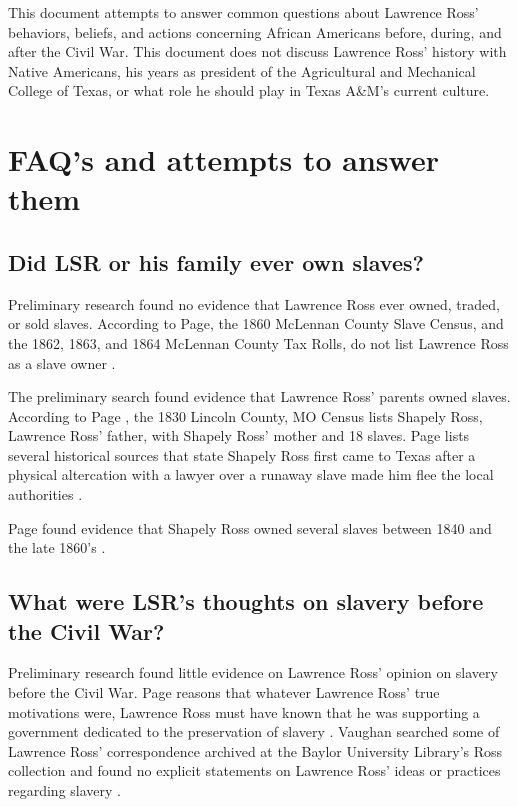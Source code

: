 \documentclass[12pt]{article}
\begin{document}
This document attempts to answer common questions about Lawrence Ross' behaviors, beliefs, and actions concerning African Americans before, during, and after the Civil War. This document does not discuss Lawrence Ross' history with Native Americans, his years as president of the Agricultural and Mechanical College of Texas, or what role he should play in Texas A\&M's current culture. 

\newpage
\section{FAQ's and attempts to answer them}

\subsection{Did LSR or his family ever own slaves? }
Preliminary research found no evidence that Lawrence Ross ever owned, traded, or sold slaves. According to Page, the 1860 McLennan County Slave Census, and the 1862, 1863, and 1864 McLennan County Tax Rolls, do not list Lawrence Ross as a slave owner \cite[pg.49]{page}.

The preliminary search found evidence that Lawrence Ross' parents owned slaves. According to Page \cite[pg.49]{page}, the 1830 Lincoln County, MO Census lists Shapely Ross, Lawrence Ross' father, with Shapely Ross' mother and 18 slaves. Page lists several historical sources that state Shapely Ross first came to Texas after a physical altercation with a lawyer over a runaway slave made him flee the local authorities \cite[pg.50--51]{page}. 

Page found evidence that Shapely Ross owned several slaves between 1840 and the late 1860's  \cite[pg.51--55]{page}. 

\subsection{What were LSR's thoughts on slavery before the Civil War? }
Preliminary research found little evidence on Lawrence Ross' opinion on slavery before the Civil War. Page reasons that whatever Lawrence Ross' true motivations were, Lawrence Ross must have known that he was supporting a government dedicated to the preservation of slavery \cite[pg. 59]{page}. Vaughan searched some of Lawrence Ross' correspondence archived at the Baylor University Library's Ross collection and found no explicit statements on Lawrence Ross' ideas or practices regarding slavery \cite{vaughan:email}. 
\end{document}
